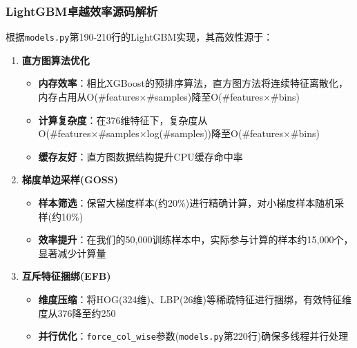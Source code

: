 \documentclass[UTF8]{report}
\theoremstyle{MyLineTheoremStyle} %
\theoremstyle{MyBlockTheoremStyle} %
\theoremstyle{MySubsubsectionStyle} %
\begin{document}
\subsubsection{LightGBM卓越效率源码解析}
根据\texttt{models.py}第190-210行的LightGBM实现，其高效性源于：
\begin{enumerate}
    \item \textbf{直方图算法优化}
    \begin{itemize}
        \item \textbf{内存效率}：相比XGBoost的预排序算法，直方图方法将连续特征离散化，内存占用从O(\#features×\#samples)降至O(\#features×\#bins)
        \item \textbf{计算复杂度}：在376维特征下，复杂度从O(\#features×\#samples×log(\#samples))降至O(\#features×\#bins)
        \item \textbf{缓存友好}：直方图数据结构提升CPU缓存命中率
    \end{itemize}
    \item \textbf{梯度单边采样(GOSS)}
    \begin{itemize}
        \item \textbf{样本筛选}：保留大梯度样本(约20\%)进行精确计算，对小梯度样本随机采样(约10\%)
        \item \textbf{效率提升}：在我们的50,000训练样本中，实际参与计算的样本约15,000个，显著减少计算量
    \end{itemize}
    \item \textbf{互斥特征捆绑(EFB)}
    \begin{itemize}
        \item \textbf{维度压缩}：将HOG(324维)、LBP(26维)等稀疏特征进行捆绑，有效特征维度从376降至约250
        \item \textbf{并行优化}：\texttt{force\_col\_wise}参数(\texttt{models.py}第220行)确保多线程并行处理
    \end{itemize}
\end{enumerate}
\end{document}
